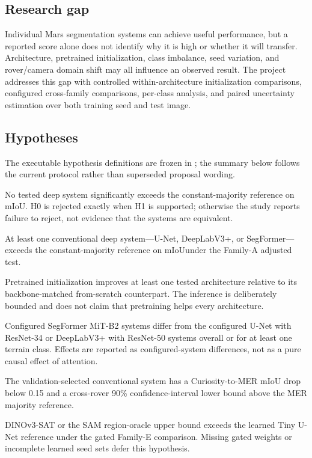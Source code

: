 \documentclass[11pt]{article}
\newcommand{\miou}{\ensuremath{\mathrm{mIoU}}}
\begin{document}
\subsection{Research gap}

Individual Mars segmentation systems can achieve useful performance, but a reported score alone
does not identify why it is high or whether it will transfer. Architecture, pretrained
initialization, class imbalance, seed variation, and rover/camera domain shift may all influence an
observed result. The project addresses this gap with controlled within-architecture initialization
comparisons, configured cross-family comparisons, per-class analysis, and paired uncertainty
estimation over both training seed and test image.

\subsection{Hypotheses}

The executable hypothesis definitions are frozen in ; the summary
below follows the current protocol rather than superseded proposal wording.

\begin{description}[leftmargin=3em,style=nextline]
  \item[H0] No tested deep system significantly exceeds the constant-majority reference on
  \miou. H0 is rejected exactly when H1 is supported; otherwise the study reports failure to reject,
  not evidence that the systems are equivalent.
  \item[H1] At least one conventional deep system---U-Net, DeepLabV3+, or SegFormer---exceeds the
  constant-majority reference on \miou under the Family-A adjusted test.
  \item[H2] Pretrained initialization improves at least one tested architecture relative to its
  backbone-matched from-scratch counterpart. The inference is deliberately bounded and does not
  claim that pretraining helps every architecture.
  \item[H3] Configured SegFormer MiT-B2 systems differ from the configured U-Net with ResNet-34 or
  DeepLabV3+ with ResNet-50 systems overall or for at least one terrain class. Effects are reported as
  configured-system differences, not as a pure causal effect of attention.
  \item[H4] The validation-selected conventional system has a Curiosity-to-MER \miou{} drop below
  0.15 and a cross-rover 90\% confidence-interval lower bound above the MER majority reference.
  \item[H5] DINOv3-SAT or the SAM region-oracle upper bound exceeds the learned Tiny U-Net reference
  under the gated Family-E comparison. Missing gated weights or incomplete learned seed sets defer
  this hypothesis.
\end{description}
\end{document}
